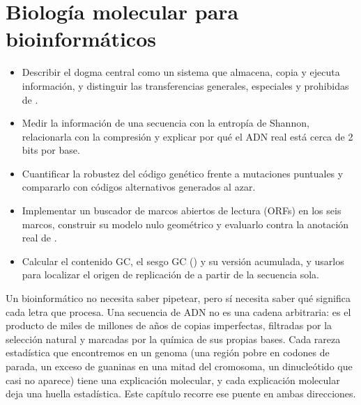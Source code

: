 \chapter{Biología molecular para bioinformáticos}\label{cap:01}


\begin{objetivos}
\begin{itemize}
  \item Describir el dogma central como un sistema que almacena, copia y ejecuta información, y distinguir las transferencias generales, especiales y prohibidas de \textcite{c01-crick1970}.
  \item Medir la información de una secuencia con la entropía de Shannon, relacionarla con la compresión y explicar por qué el ADN real está cerca de 2 bits por base.
  \item Cuantificar la robustez del código genético frente a mutaciones puntuales y compararlo con códigos alternativos generados al azar.
  \item Implementar un buscador de marcos abiertos de lectura (ORFs) en los seis marcos, construir su modelo nulo geométrico y evaluarlo contra la anotación real de .
  \item Calcular el contenido GC, el sesgo GC () y su versión acumulada, y usarlos para localizar el origen de replicación de  a partir de la secuencia sola.
\end{itemize}
\end{objetivos}

Un bioinformático no necesita saber pipetear, pero sí necesita saber qué significa cada letra que procesa. Una secuencia de ADN no es una cadena arbitraria: es el producto de miles de millones de años de copias imperfectas, filtradas por la selección natural y marcadas por la química de sus propias bases. Cada rareza estadística que encontremos en un genoma (una región pobre en codones de parada, un exceso de guaninas en una mitad del cromosoma, un dinucleótido que casi no aparece) tiene una explicación molecular, y cada explicación molecular deja una huella estadística. Este capítulo recorre ese puente en ambas direcciones.

